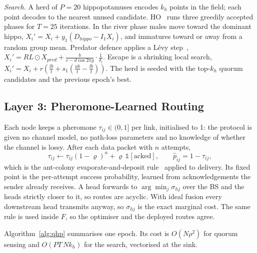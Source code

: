 \emph{Search.} A herd of $P{=}20$ hippopotamuses encodes $k_h$ points in the field; each point decodes to the nearest unused candidate. HO~\cite{amiri2024hippo} runs three greedily accepted phases for $T{=}25$ iterations. In the river phase males move toward the dominant hippo, $X_i'=X_i+y_1(D_{hippo}-I_1X_i)$, and immatures toward or away from a random group mean. Predator defence applies a L\'evy step~\cite{mantegna1994levy}, $X_i'=RL\odot X_{pred}+\frac{b}{c-d\cos 2\pi g}\cdot\frac{1}{\delta_i}$. Escape is a shrinking local search, $X_i'=X_i+r(\frac{lb}{t}+s_1(\frac{ub}{t}-\frac{lb}{t}))$. The herd is seeded with the top-$k_h$ quorum candidates and the previous epoch's best.

\subsection{Layer 3: Pheromone-Learned Routing}
Each node keeps a pheromone $\tau_{ij}\in(0,1]$ per link, initialised to 1: the protocol is given no channel model, no path-loss parameters and no knowledge of whether the channel is lossy. After each data packet with $n$ attempts,
\begin{equation}
\tau_{ij}\leftarrow\tau_{ij}(1-\varrho)^{n}+\varrho\,\mathbb 1[\text{acked}],\qquad \hat p_{ij}=1-\tau_{ij},
\label{eq:pheromone}
\end{equation}
which is the ant-colony evaporate-and-deposit rule~\cite{dorigo2006aco} applied to delivery. Its fixed point is the per-attempt success probability, learned from acknowledgements the sender already receives. A head forwards to $\arg\min_{j}\sigma_{hj}$ over the BS and the heads strictly closer to it, so routes are acyclic. With ideal fusion every downstream head transmits anyway, so $\sigma_{hj}$ is the exact marginal cost. The same rule is used inside $F$, so the optimiser and the deployed routes agree.

Algorithm~\ref{alg:qhp} summarises one epoch. Its cost is $O(N\rho^2)$ for quorum sensing and $O(PT\,N k_h)$ for the search, vectorised at the sink.


